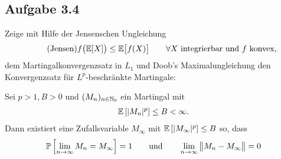 \subsection{Aufgabe 3.4}
Zeige mit Hilfe der Jensenschen Ungleichung
\begin{align}\label{eqJensenscheUngleichung}\tag{Jensen}
	f\big(\mathbb{E}[X]\big)\leq\mathbb{E}\big[f(X)\big]\qquad\forall X\text{ integrierbar und $f$ konvex},
\end{align}
dem Martingalkonvergenzsatz in $L_1$ und Doob's Maximalungleichung den Konvergenzsatz für $L^p$-beschränkte Martingale:

\begin{theorem}\enter
	Sei $p>1,B>0$ und $(M_n)_{n\in\mathbb{N}_0}$ ein Martingal mit 
	\begin{align*}
		\mathbb{E}\left[|M_n|^p\right]\leq B<\infty.
	\end{align*}
	Dann existiert eine Zufallsvariable $M_\infty$ mit $\mathbb{E}\left[|M_\infty|^p\right]\leq B$ so, dass
	\begin{align*}
		\mathbb{P}\left[\lim\limits_{n\to\infty} M_n=M_\infty\right]=1
		\qquad\text{und}\qquad
		\lim\limits_{n\to\infty}\big\Vert M_n-M_\infty\big\Vert=0
	\end{align*}
\end{theorem}

